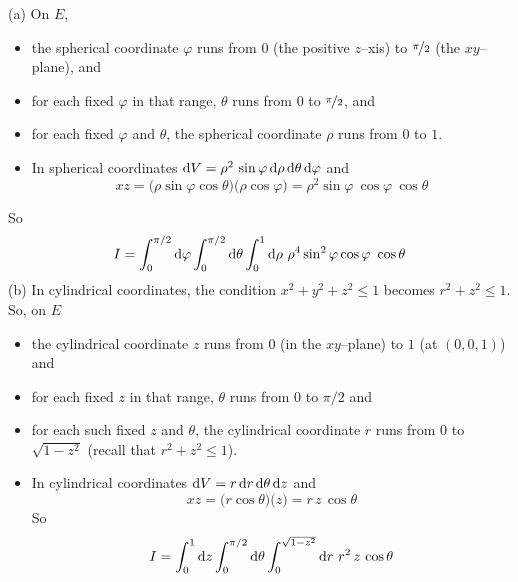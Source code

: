 \begin{solution}
(a)
On $E$,
\begin{itemize}
\item
the spherical coordinate $\varphi$ runs from $0$ (the positive $z$--xis)
to $\nicefrac{\pi}{2}$ (the $xy$--plane), and
\item 
for each fixed $\varphi$ in that range,
$\theta$ runs from $0$ to $\nicefrac{\pi}{2}$, and
\item
for each fixed $\varphi$ and $\theta$, the spherical coordinate
$\rho$ runs from $0$ to $1$.
\item
In spherical coordinates 
  $\mathrm{d}V=\rho^2\,\sin\varphi\,\mathrm{d}\rho\,\mathrm{d}\theta\, \mathrm{d}\varphi$
and
\begin{equation*}
   xz=\big(\rho\sin\varphi\cos\theta\big)\big(\rho\cos\varphi\big)
      =\rho^2 \sin\varphi\ \cos\varphi\ \cos\theta
\end{equation*}
\end{itemize}
So
\begin{align*}
I=\int_0^{\pi/2}\dee{\varphi}\int_0^{\pi/2}\dee{\theta}\int_0^1\dee{\rho}\ 
         \rho^4\sin^2\varphi\cos\varphi\ \cos\theta
\end{align*} 
(b)
In cylindrical coordinates, the condition $x^2+y^2+z^2\le 1$
becomes $r^2+z^2\le 1$. So, on $E$
\begin{itemize}
\item
the cylindrical coordinate $z$ runs from $0$ (in the $xy$--plane)
to $1$ (at $(0,0,1)$) and
\item
for each fixed $z$ in that range, $\theta$ runs from $0$ to $\pi/2$ and
\item
for each such fixed $z$ and $\theta$, the cylindrical coordinate
$r$ runs from $0$ to $\sqrt{1-z^2}$ (recall that $r^2+z^2\le 1$).
\item
In cylindrical coordinates 
  $\mathrm{d}V=r\,\mathrm{d}r\,\mathrm{d}\theta\, \mathrm{d}z$
and
\begin{equation*}
   xz=\big(r\cos\theta\big)\big(z\big)
      =r\,z\, \cos\theta
\end{equation*}
So
\begin{align*}
I=\int_0^1\dee{z}\int_0^{\pi/2}\dee{\theta}\int_0^{\sqrt{1-z^2}}\dee{r} \ 
         r^2\,z\,\cos\theta
\end{align*}  


\end{itemize}
\end{solution}

